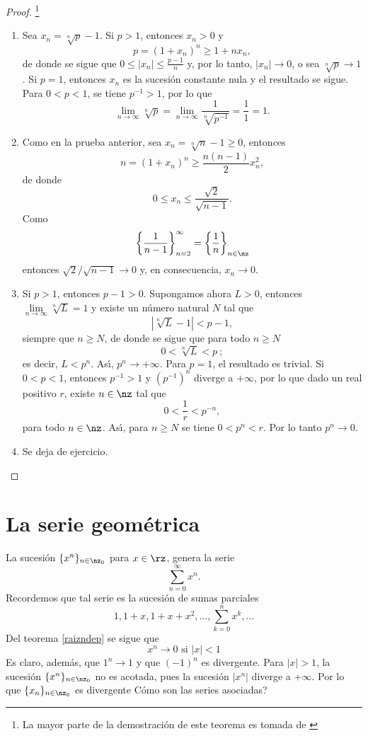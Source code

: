 \begin{proof}
\footnote{La mayor parte de la demostraci\'{o}n de este teorema es tomada de
\cite{Rudin}} \hfill

\begin{enumerate}
\item Sea $x_{n}=\sqrt[n]{p}-1$. Si $p>1$, entonces $x_{n}>0$ y
\[
p=(1+x_{n})^{n}\geq1+nx_{n},
\]
de donde se sigue que $0\leq|x_{n}|\leq\frac{p-1}{n}$ y, por lo tanto,
$|x_{n}|\rightarrow0$, o sea $\sqrt[n]{p}\rightarrow1$. Si $p=1$, entonces
$x_{n}$ es la sucesi\'{o}n constante nula y el resultado se sigue. Para
$0<p<1$, se tiene $p^{-1}>1$, por lo que
\[
\lim_{n\rightarrow\infty}\sqrt[n]{p}=\lim_{n\rightarrow\infty}\frac
{1}{\sqrt[n]{p^{-1}}}=\frac{1}{1}=1.
\]


\item Como en la prueba anterior, sea $x_{n}=\sqrt[n]{n}-1\geq0$, entonces
\[
n=(1+x_{n})^{n}\geq\frac{n(n-1)}{2}x_{n}^{2},
\]
de donde
\[
0\leq x_{n}\leq\frac{\sqrt{2}}{\sqrt{n-1}}.
\]
Como
\[
\left\{  \frac{1}{n-1}\right\}  _{n=2}^{\infty}=\left\{  \frac{1}{n}\right\}
_{n\in\nz}%
\]
entonces $\sqrt{2}/\sqrt{n-1}\rightarrow0$ y, en consecuencia, $x_{n}%
\rightarrow0$.

\item Si $p>1$, entonces $p-1>0$. Supongamos ahora $L>0$, entonces
$\lim\limits_{n\rightarrow\infty}\sqrt[n]{L}=1$ y existe un n\'{u}mero natural
$N$ tal que
\[
|\sqrt[n]{L}-1|<p-1,
\]
siempre que $n\geq N$, de donde se sigue que para todo $n\geq N$
\[
0<\sqrt[n]{L}<p\ ;
\]
es decir, $L<p^{n}$. As\'{\i}, $p^{n}\rightarrow+\infty$. Para $p=1$, el
resultado es trivial. Si $0<p<1$, entonces $p^{-1}>1$ y $(p^{-1})^{n}$ diverge
a $+\infty$, por lo que dado un real positivo $r$, existe $n\in\nz$ tal que
\[
0<\frac{1}{r}<p^{-n},
\]
para todo $n\in\nz$. As\'{\i}, para $n\geq N$ se tiene $0<p^{n}<r$. Por lo
tanto $p^{n}\rightarrow0$.

\item Se deja de ejercicio.
\end{enumerate}
\end{proof}

\section{La serie geom\'{e}trica}%

%
La sucesi\'{o}n $\{x^{n}\}_{n\in\nz_{0}}$ para $x\in\rz$, genera la serie
\[
\sum_{n=0}^{\infty}x^{n}.
\]
Recordemos que tal serie es la sucesi\'{o}n de sumas parciales
\[
1,1+x,1+x+x^{2},\dots,\sum_{k=0}^{n}x^{k},\dots
\]
Del teorema \ref{raizndep} se sigue que
\begin{equation}
x^{n}\rightarrow0\mbox{ \ si \ }|x|<1 \label{geometricaconvergente}%
\end{equation}
Es claro, adem\'{a}s, que $1^{n}\rightarrow1$ y que $(-1)^{n}$ es divergente.
Para $|x|>1$, la sucesi\'{o}n $\{x^{n}\}_{n\in\nz_{0}}$ no es acotada, pues la
sucesi\'{o}n $|x^{n}|$ diverge a $+\infty$. Por lo que $\{x_{n}\}_{n\in
\nz_{0}}$ es divergente \textquestiondown C\'{o}mo son las series asociadas?

